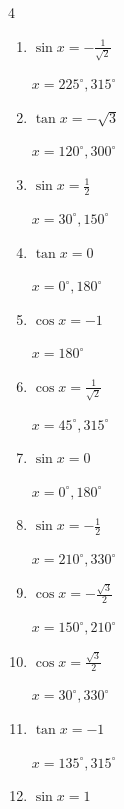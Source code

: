 \begin{multicols}{4}
\begin{enumerate}
        $\displaystyle x = 30^{\circ} , 330^{\circ}$

  \item $\displaystyle \sin{x}  = -\frac{1}{\sqrt{2}}$

        $\displaystyle x = 225^{\circ} , 315^{\circ}$

  \item $\displaystyle \tan{x}  = -\sqrt{3}$

        $\displaystyle x = 120^{\circ} , 300^{\circ}$

\columnbreak %

  \item $\displaystyle \sin{x}  = \frac{1}{2}$

        $\displaystyle x = 30^{\circ} , 150^{\circ}$

  \item $\displaystyle \tan{x}  = 0$

        $\displaystyle x = 0^{\circ} , 180^{\circ}$

  \item $\displaystyle \cos{x}  = -1$

        $\displaystyle x = 180^{\circ}$

  \item $\displaystyle \cos{x}  = \frac{1}{\sqrt{2}}$

        $\displaystyle x = 45^{\circ} , 315^{\circ}$

  \item $\displaystyle \sin{x}  = 0$

        $\displaystyle x = 0^{\circ} , 180^{\circ}$

  \item $\displaystyle \sin{x}  = -\frac{1}{2}$

        $\displaystyle x = 210^{\circ} , 330^{\circ}$

  \item $\displaystyle \cos{x}  = -\frac{\sqrt{3}}{2}$

        $\displaystyle x = 150^{\circ} , 210^{\circ}$

  \item $\displaystyle \cos{x}  = \frac{\sqrt{3}}{2}$

        $\displaystyle x = 30^{\circ} , 330^{\circ}$

  \item $\displaystyle \tan{x}  = -1$

        $\displaystyle x = 135^{\circ} , 315^{\circ}$

  \item $\displaystyle \sin{x}  = 1$


\end{enumerate}
\end{multicols}
